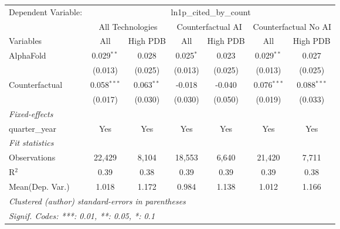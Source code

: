 \begingroup
\centering
\begin{tabular}{lcccccc}
   \tabularnewline \midrule \midrule
   Dependent Variable: & \multicolumn{6}{c}{ln1p\_cited\_by\_count}\\
 & \multicolumn{2}{c}{All Technologies} & \multicolumn{2}{c}{Counterfactual AI} & \multicolumn{2}{c}{Counterfactual No AI} \\
\cmidrule(lr){1-1}\cmidrule(lr){2-3} \cmidrule(lr){4-5} \cmidrule(lr){6-7}
Variables & \multicolumn{1}{c}{All} & \multicolumn{1}{c}{High PDB} & \multicolumn{1}{c}{All} & \multicolumn{1}{c}{High PDB} & \multicolumn{1}{c}{All} & \multicolumn{1}{c}{High PDB} \\
\cmidrule(lr){1-1}\cmidrule(lr){2-2} \cmidrule(lr){3-3} \cmidrule(lr){4-4} \cmidrule(lr){5-5} \cmidrule(lr){6-6} \cmidrule(lr){7-7}
   AlphaFold      & 0.029$^{**}$  & 0.028        & 0.025$^{*}$ & 0.023   & 0.029$^{**}$  & 0.027\\   
                  & (0.013)       & (0.025)      & (0.013)     & (0.025) & (0.013)       & (0.025)\\   
   Counterfactual & 0.058$^{***}$ & 0.063$^{**}$ & -0.018      & -0.040  & 0.076$^{***}$ & 0.088$^{***}$\\   
                  & (0.017)       & (0.030)      & (0.030)     & (0.050) & (0.019)       & (0.033)\\   
   \midrule
   \emph{Fixed-effects}\\
   quarter\_year  & Yes           & Yes          & Yes         & Yes     & Yes           & Yes\\  
   \midrule
   \emph{Fit statistics}\\
   Observations   & 22,429        & 8,104        & 18,553      & 6,640   & 21,420        & 7,711\\  
   R$^2$          & 0.39          & 0.38         & 0.39        & 0.39    & 0.39          & 0.38\\  
Mean(Dep. Var.) & 1.018 & 1.172 & 0.984 & 1.138 & 1.012 & 1.166 \\
   \midrule \midrule
   \multicolumn{7}{l}{\emph{Clustered (author) standard-errors in parentheses}}\\
   \multicolumn{7}{l}{\emph{Signif. Codes: ***: 0.01, **: 0.05, *: 0.1}}\\
\end{tabular}
\par\endgroup
